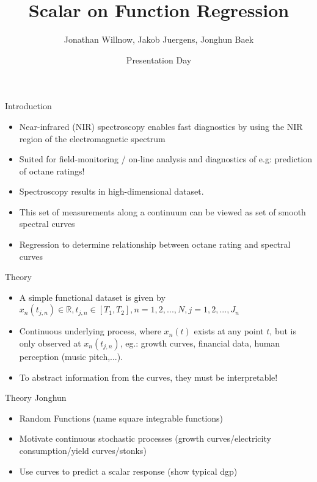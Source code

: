 \documentclass{beamer}
\title{Scalar on Function Regression}
\author{Jonathan Willnow, Jakob Juergens, Jonghun Baek}
\date{{\color{red}}Presentation Day}
\begin{document}
	
	\begin{frame}
		\titlepage 
	\end{frame}
	
	\logo{}
	
	
	\begin{frame}{Introduction}
	
		\begin{itemize}
			\item Near-infrared (NIR) spectroscopy enables fast diagnostics by using the NIR region of the electromagnetic spectrum
			\item Suited for field-monitoring / on-line analysis and diagnostics of e.g: prediction of octane ratings!
			
			\item Spectroscopy results in high-dimensional dataset.
			\item
			This set of measurements along a continuum can be viewed as set of smooth spectral curves
			\item
			Regression to determine relationship between octane rating and spectral curves
			\end{itemize}
	\end{frame}
	
	\begin{frame}{Theory}
		

		
		\begin{itemize}
			\item
			A simple functional dataset is given by $x_{n}(t_{j,n}) \in \mathbb{R}, t_{j,n} \in [T_1, T_2], n = 1,2,...,N, j = 1,2,..., J_n  $
			\item Continuous underlying process, where $x_n(t)$ exists at any point $t$, but is only observed at $x_{n}(t_{j,n})$, eg.: growth curves, financial data, human perception (music pitch,...).
			
			\item To abstract information from the curves, they must be interpretable!
			
			\end{itemize}
	\end{frame}

	\begin{frame}{Theory}
		Jonghun
		\begin{itemize}
			\item Random Functions (name square integrable functions)
			\item Motivate continuous stochastic processes (growth curves/electricity consumption/yield curves/stonks)
			\item Use curves to predict a scalar response (show typical dgp)
		\end{itemize}
	\end{frame}
\end{document}
